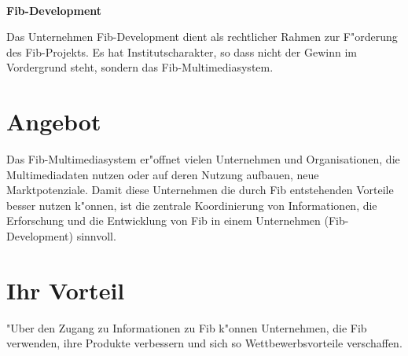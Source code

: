 \documentclass[12pt,a4paper]{article}
\begin{document}





\ \vspace{-2.5cm}
\begin{center}
	\LARGE\bf Fib-Development\\
\end{center}

\bigskip\noindent
Das Unternehmen Fib-Development dient als rechtlicher Rahmen zur F"orderung des Fib-Projekts. Es hat Institutscharakter, so dass nicht der Gewinn im Vordergrund steht, sondern das Fib-Multimediasystem.


\section{Angebot}

Das Fib-Multimediasystem er"offnet vielen Unternehmen und Organisationen, die Multimediadaten nutzen oder auf deren Nutzung aufbauen, neue Marktpotenziale. Damit diese Unternehmen die durch Fib entstehenden Vorteile besser nutzen k"onnen, ist die zentrale Koordinierung von Informationen, die Erforschung und die Entwicklung von Fib in einem Unternehmen (Fib-Development) sinnvoll.


\section{Ihr Vorteil}

"Uber den Zugang zu Informationen zu Fib k"onnen Unternehmen, die Fib verwenden, ihre Produkte verbessern und sich so Wettbewerbsvorteile verschaffen.
\end{document}
